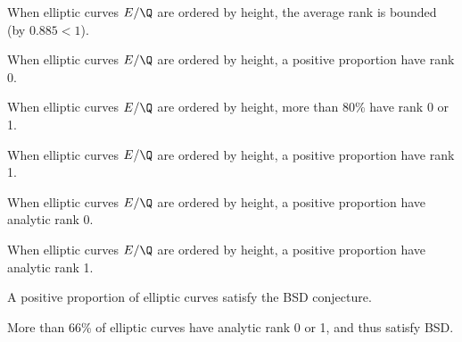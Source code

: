 \begin{frame}
\begin{thm}
When elliptic curves $E/\Q$ are ordered by height, the average rank is bounded (by $0.885<1$). 
\end{thm} \pause

\begin{cor}
When elliptic curves $E/\Q$ are ordered by height, a positive proportion have rank 0.
\end{cor}

\begin{cor}
When elliptic curves $E/\Q$ are ordered by height, more than 80\% have rank 0 or 1. 
\end{cor}
\end{frame}



\begin{frame}[plain]
\begin{thm}
When elliptic curves $E/\Q$ are ordered by height, a positive proportion have rank 1. 
\end{thm}
\end{frame}



\begin{frame}
\begin{thm}
When elliptic curves $E/\Q$ are ordered by height, a positive proportion have analytic rank 0.
\end{thm} \pause

\begin{thm}
When elliptic curves $E/\Q$ are ordered by height, a positive proportion have analytic rank 1.
\end{thm} \pause

\begin{cor}
A positive proportion of elliptic curves satisfy the BSD conjecture. 
\end{cor} \pause

\begin{thm}
More than 66\% of elliptic curves have analytic rank 0 or 1, and thus satisfy BSD.
\end{thm}
\end{frame}



\begin{frame}
\end{frame}



